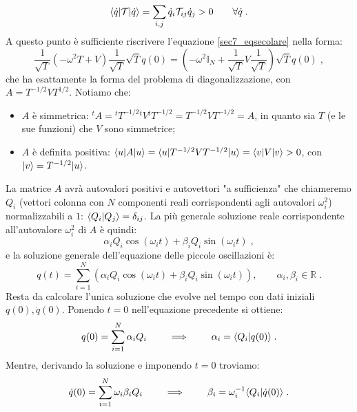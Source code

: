 \begin{equation}
\langle \dot{q}|\mathcal{T}|\dot{q}\rangle=\sum_{i,j}\dot{q}_i\mathcal{T}_{ij}\dot{q}_j>0\qquad \forall \dot{q}\;.
\end{equation}
A questo punto è sufficiente riscrivere l'equazione \eqref{sec7_eqsecolare} nella forma:
\begin{equation}
\frac{1}{\sqrt{T}}(-\omega^2T+V)\frac{1}{\sqrt{T}}\sqrt{T}q(0)=\left(-\omega^2\mathbb{I}_N+\frac{1}{\sqrt{T}}V\frac{1}{\sqrt{T}}\right)\sqrt{T}q(0)\;,
\end{equation}
che ha esattamente la forma del problema di diagonalizzazione, con $A=T^{-1/2}VT^{1/2}$. Notiamo che:
\begin{itemize}
\item $A$ è simmetrica: ${}^tA={}^tT^{-1/2}{}^tV{}^tT^{-1/2}=T^{-1/2}VT^{-1/2}=A$, in quanto sia $T$ (e le sue funzioni) che $V$ sono simmetrice;
\item $A$ è definita positiva: $\langle u|A|u\rangle=\langle u|T^{-1/2}VT^{-1/2}|u\rangle=\langle v|V|v\rangle>0$, con $|v\rangle=T^{-1/2}|u\rangle$.
\end{itemize}
La matrice $A$ avrà autovalori positivi e autovettori "a sufficienza" che chiameremo $Q_i$ (vettori colonna con $N$ componenti reali corrispondenti agli autovalori $\omega^2_i$) normalizzabili a $1$: $\langle Q_i|Q_j\rangle=\delta_{ij}$. La più generale soluzione reale corrispondente all'autovalore $\omega_i^2$ di $A$ è quindi:
\begin{equation}
\alpha_iQ_i\cos(\omega_it)+\beta_iQ_i\sin(\omega_it)\;,
\end{equation}
e la soluzione generale dell'equazione delle piccole oscillazioni è:
\begin{equation}
q(t)=\sum_{i=1}^N\left(\alpha_iQ_i\cos(\omega_it)+\beta_iQ_i\sin(\omega_it)\right),\qquad \alpha_i,\beta_i\in\mathbb{R}\;.
\end{equation}
Resta da calcolare l'unica soluzione che evolve nel tempo con dati iniziali $q(0),\dot{q}(0)$. Ponendo $t=0$ nell'equazione precedente si ottiene:
\begin{equation}
q(0)=\sum_{i=1}^N \alpha_iQ_i\qquad \implies\qquad \alpha_i = \langle Q_i|q(0)\rangle\;.
\end{equation}
Mentre, derivando la soluzione e imponendo $t=0$ troviamo:
\begin{equation}
\dot{q}(0)=\sum_{i=1}^N\omega_i\beta_iQ_i\qquad \implies\qquad \beta_i=\omega_i^{-1}\langle Q_i|\dot{q}(0)\rangle\;.
\end{equation}
\pagebreak
